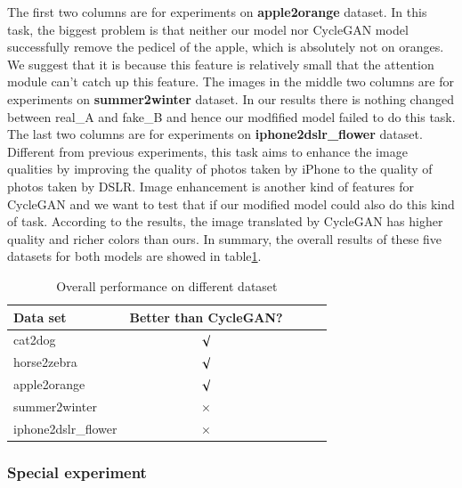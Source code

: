 \documentclass{article}
\begin{document}
The first two columns are for experiments on \textbf{apple2orange} dataset. In this task, the biggest problem is that neither our model nor CycleGAN model successfully remove the pedicel of the apple, which is absolutely not on oranges. We suggest that it is because this feature is relatively small that the attention module can't catch up this feature. The images in the middle two columns are for experiments on \textbf{summer2winter} dataset. In our results there is nothing changed between real\_A and fake\_B and hence our modfified model failed to do this task. The last two columns are for experiments on \textbf{iphone2dslr\_flower} dataset. Different from previous experiments, this task aims to enhance the image qualities by improving the quality of photos taken by iPhone to the quality of photos taken by DSLR. Image enhancement is another kind of features for CycleGAN and we want to test that if our modified model could also do this kind of task. According to the results, the image translated by CycleGAN has higher quality and richer colors than ours. In summary, the overall results of these five datasets for both models are showed in table\ref{tab:overall}.

\begin{table}[tb]
\vskip 3mm
\begin{center}
\begin{small}
\begin{sc}
\begin{tabular}{lcccr}
\hline
\abovespace\belowspace
Data set & Better than CycleGAN? \\
\hline
cat2dog    & $\surd$ \\
horse2zebra & $\surd$\\
apple2orange & $\surd$ \\
summer2winter  &   $\times$\\
iphone2dslr\_flower & $\times$ \\

\hline
\end{tabular}
\end{sc}
\end{small}
\caption{Overall performance on different dataset}
\label{tab:overall}
\end{center}
\vskip -3mm
\end{table}

\subsubsection{Special experiment}
\end{document}
